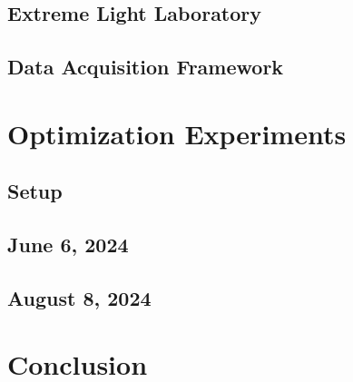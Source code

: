 \subsection{Extreme Light Laboratory}

\subsection{Data Acquisition Framework}

\section{Optimization Experiments}

\subsection{Setup}

\subsection{June 6, 2024}

\subsection{August 8, 2024}

\section{Conclusion}